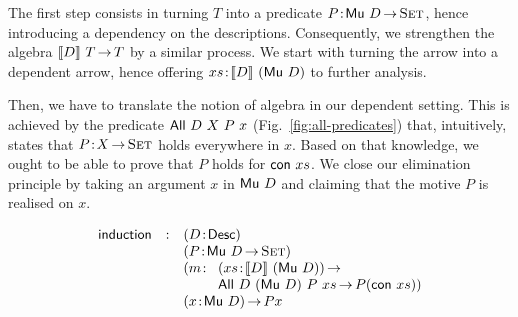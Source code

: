 The first step consists in turning $T$ into a predicate
$\Bhab{P}{\Mu{D} \To \Set}$, hence introducing a dependency on the
descriptions. Consequently, we strengthen the algebra $\descop{D}{T}
\To T$ by a similar process. We start with turning the arrow into a
dependent arrow, hence offering $\Bhab{xs}{\descop{D}{(\Mu{D})}}$ to
further analysis. 

Then, we have to translate the notion of algebra in our dependent
setting. This is achieved by the predicate $\All{D}{X}{P}{x}$
(Fig.~\ref{fig:all-predicates}) that, intuitively, states that
$\Bhab{P}{X \To \Set}$ holds everywhere in $x$. Based on that
knowledge, we ought to be able to prove that $P$ holds for
$\Con{xs}$. We close our elimination principle by taking an argument
$x$ in $\Mu{D}$ and claiming that the motive $P$ is realised on $x$.

\[
\begin{array}{lcll}
\F{induction} & : & \multicolumn{2}{l}{\PITEL{D}{\Desc}}                   \\
              &   & \multicolumn{2}{l}{\PITEL{P}{\Mu{D} \To \Set}}         \\
              &   & \PITEL{m}{& \PI{xs}{\descop{D}{(\Mu{D})}}              \\
              &   &           & \All{D}{(\Mu{D})}{P}{xs} \To P (\Con{xs})} \\
              &   & \multicolumn{2}{l}{\PI{x}{\Mu{D}} P x}
\end{array}
\]

